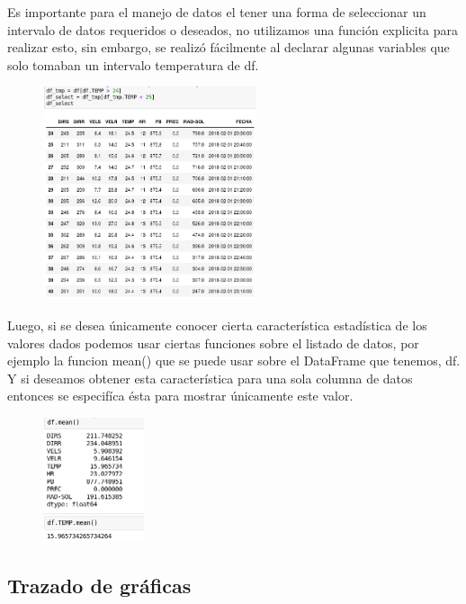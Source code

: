 \documentclass{article}
\begin{document}
Es importante para el manejo de datos el tener una forma de seleccionar un intervalo de datos requeridos o deseados, no utilizamos una función explicita para realizar esto, sin embargo, se realizó fácilmente al declarar algunas variables que solo tomaban un intervalo temperatura de df.
\begin{figure}[h]
\centering
\includegraphics[height=237px,width=238px]{9thcell.png}
\end{figure}

Luego, si se desea únicamente conocer cierta característica estadística de los valores dados podemos usar ciertas funciones sobre el listado de datos, por ejemplo la funcion mean() que se puede usar sobre el DataFrame que tenemos, df. Y si deseamos obtener esta característica para una sola columna de datos entonces se especifíca ésta para mostrar únicamente este valor.
\begin{figure}[ht]
\centering
\includegraphics[height=138px,width=112px]{10th11thcell.png}
\end{figure}

\subsection{Trazado de gráficas}
\end{document}
